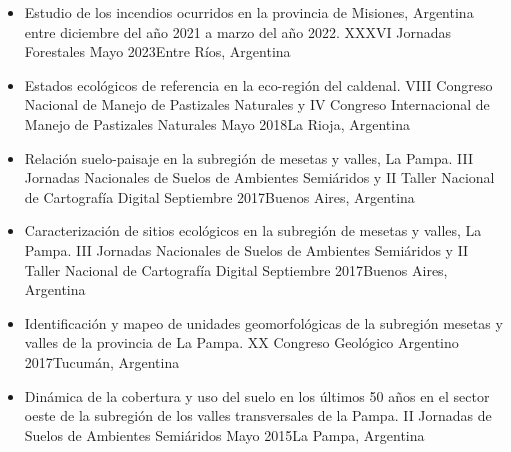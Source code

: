 \documentclass[9.5pt,a4paper,ragged2e, normalphoto]{altacv}
\begin{document}
\begin{itemize}
 \item {Estudio de los incendios ocurridos en la provincia de Misiones, Argentina entre diciembre del año 2021 a marzo del año 2022.
 XXXVI Jornadas Forestales}
\cvevent{} {}
{Mayo 2023}{Entre Ríos, Argentina}{}{}

\item {Estados ecológicos de referencia en la eco-región del caldenal. VIII Congreso Nacional de Manejo de Pastizales Naturales y IV Congreso Internacional de Manejo de Pastizales Naturales}
\cvevent{} {}
{Mayo 2018}{La Rioja, Argentina}{}{}

\item {Relación suelo-paisaje en la subregión de mesetas y valles, La Pampa. III Jornadas Nacionales de Suelos de Ambientes Semiáridos y II Taller Nacional de Cartografía Digital }
\cvevent{} {}
{Septiembre 2017}{Buenos Aires, Argentina}{}{}

\item {Caracterización de sitios ecológicos en la subregión de mesetas y valles, La Pampa. III Jornadas Nacionales de Suelos de Ambientes Semiáridos y II Taller Nacional de Cartografía Digital}
\cvevent{} {}
{Septiembre 2017}{Buenos Aires, Argentina}{}{}

\item {Identificación y mapeo de unidades geomorfológicas de la subregión mesetas y valles de la provincia de La Pampa. XX Congreso Geológico Argentino }
\cvevent{} {}
{2017}{Tucumán, Argentina}{}{}

\item {Dinámica de la cobertura y uso del suelo en los últimos 50 años en el sector oeste de la subregión de los valles transversales de la Pampa. II Jornadas de Suelos de Ambientes Semiáridos}
\cvevent{} {}
{Mayo 2015}{La Pampa, Argentina}{}{}

\end{itemize}

\end{document}
